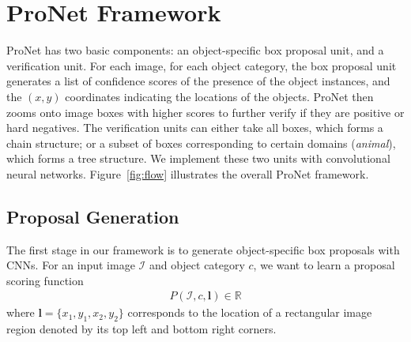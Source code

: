 \documentclass[10pt,twocolumn,letterpaper]{article}
\begin{document}
\section{ProNet Framework}

ProNet has two basic components: an object-specific box proposal unit, and a verification unit. For each image, for each object category, the box proposal unit generates a list of confidence scores of the presence of the object instances, and the $(x,y)$ coordinates indicating the locations of the objects. ProNet then zooms onto image boxes with higher scores to further verify if they are positive or hard negatives. The verification units can either take all boxes, which forms a chain structure; or a subset of boxes corresponding to certain domains (\eg \textit{animal}), which forms a tree structure. We implement these two units with convolutional neural networks. Figure~\ref{fig:flow} illustrates the overall ProNet framework.




\subsection{Proposal Generation}
The first stage in our framework is to generate object-specific box proposals with CNNs. For an input image $\mathcal{I}$ and object category $c$, we want to learn a proposal scoring function
\begin{align*}
P(\mathcal{I}, c, \mathbf{l}) \in \mathbb{R}
\end{align*}
where $\mathbf{l} = \{x_1, y_1, x_2, y_2\}$ corresponds to the location of a rectangular image region denoted by its top left and bottom right corners.
\end{document}
